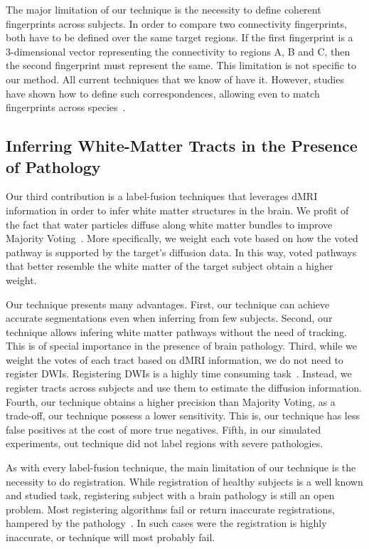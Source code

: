 The major limitation of our technique is the necessity to define coherent
fingerprints across subjects. In order to compare two connectivity fingerprints,
both have to be defined over the same target regions. If the first fingerprint
is a 3-dimensional vector representing the connectivity to regions A, B and C,
then the second fingerprint must represent the same. This limitation is not
specific to our method. All current techniques that we know of have it. However,
studies have shown how to define such correspondences, allowing even to match
fingerprints across species~\cite{Mars2016, Mars2018}.

\subsection{Inferring White-Matter Tracts in the Presence of Pathology}
Our third contribution is a label-fusion techniques that leverages dMRI information
in order to infer white matter structures in the brain. We profit of the fact
that water particles diffuse along white matter bundles to improve Majority
Voting~\cite{Xu1992}. More specifically, we weight each vote based on how the voted pathway
is supported by the target's diffusion data. In this way, voted
pathways that better resemble the white matter of the target subject obtain a 
higher weight.

Our technique presents many advantages. First, our technique can achieve accurate
segmentations even when inferring from few subjects. Second, our technique
allows infering white matter pathways without the need of tracking. This is of
special importance in the presence of brain pathology. Third, while we weight the
votes of each tract based on dMRI information, we do not need to register
DWIs. Registering DWIs is a highly time consuming task~\cite{ODonnell2017}.
Instead, we register tracts across subjects and use them to estimate the diffusion
information. Fourth, our technique obtains a higher precision than Majority
Voting, as a trade-off, our technique possess a lower sensitivity. This is,
our technique has less false positives at the cost of more true negatives.
Fifth, in our simulated experiments, out technique did not label regions with
severe pathologies.

As with every label-fusion technique, the main limitation of our technique
is the necessity to do registration. While registration of healthy subjects
is a well known and studied task, registering subject with a brain pathology
is still an open problem. Most registering algorithms fail or return inaccurate
registrations, hampered by the pathology~\cite{Lutkenhoff2014}. In such cases
were the registration is highly inaccurate, or technique will most probably fail.

